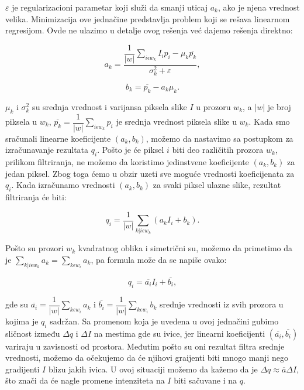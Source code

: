 \documentclass[a4paper,12pt,titlepage]{article}
\begin{document}
$\varepsilon$ je regularizacioni parametar koji služi da smanji uticaj $a_k$, ako je njena vrednost velika. Minimizacija ove jednačine predstavlja problem koji se rešava linearnom regresijom. Ovde ne ulazimo u detalje ovog rešenja već dajemo rešenja direktno:

\begin{equation}\label{eq:gf4}
	a_k = \dfrac{\dfrac{1}{|w|} \sum_{i \epsilon w_k} I_ip_i - \mu_k \overline{p_k}}{\sigma_k^2 + \varepsilon},
\end{equation}

\begin{equation}\label{eq:gf5}
	b_k = \overline{p_k} - a_k \mu_k.
\end{equation}

$\mu_k$ i $\sigma_k^2$ su srednja vrednost i varijansa piksela slike $I$ u prozoru $w_k$, a $|w|$ je broj piksela u $w_k$, $\overline{p_k} = \dfrac{1}{|w|} \sum_{i \epsilon w_k} p_i$ je srednja vrednost piksela slike u $w_k$. Kada smo sračunali linearne koeficijente $(a_k, b_k)$, možemo da nastavimo sa postupkom za izračunavanje rezultata $q_i$. Pošto je će piksel $i$ biti deo različitih prozora $w_k$, prilikom filtriranja, ne možemo da koristimo jedinstvene koeficijente $(a_k, b_k)$ za jedan piksel. Zbog toga ćemo u obzir uzeti sve moguće vrednosti koeficijenata za $q_i$. Kada izračunamo vrednosti $(a_k, b_k)$ za svaki piksel ulazne slike, rezultat filtriranja će biti:

\begin{equation}\label{eq:gf6}
	q_i = \dfrac{1}{|w|} \sum_{k|i \epsilon w_k} (a_kI_i + b_k).
\end{equation}    

Pošto su prozori $w_k$ kvadratnog oblika i simetrični su, možemo da primetimo da je $\sum_{k|i \epsilon w_k} a_k = \sum_{k \epsilon w_i} a_k$, pa formula može da se napiše ovako:

\begin{equation}\label{eq:gf7}
	q_i = \overline{a_i}I_i + \overline{b_i},
\end{equation}

gde su $\overline{a_i} = \dfrac{1}{|w|}\sum_{k \epsilon w_i} a_k$ i $\overline{b_i} = \dfrac{1}{|w|}\sum_{k \epsilon w_i} b_k$ srednje vrednosti iz svih prozora u kojima je $q_i$ sadržan. Sa promenom koja je uvedena u ovoj jednačini gubimo sličnost između $\Delta q$ i $\Delta I$ na mestima gde su ivice, jer linearni koeficijenti $(\overline{a_i}, \overline{b_i})$ variraju u zavisnosti od prostora. Međutim pošto su oni rezultat filtra srednje vrednosti, možemo da očekujemo da će njihovi graijenti biti mnogo manji nego gradijenti $I$ blizu jakih ivica. U ovoj situaciji možemo da kažemo da je $\Delta q \approx \overline{a} \Delta I$, što znači da će nagle promene intenziteta na $I$ biti sačuvane i na $q$. 
\end{document}

